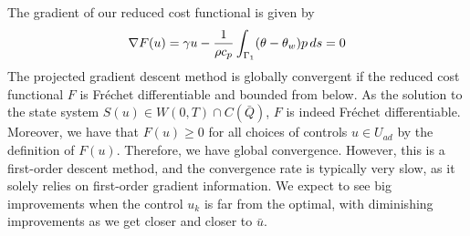 The gradient of our reduced cost functional is given by
%
\begin{equation*}
    \nabla F(u) =  \gamma u - \frac{1}{\rho c_p} \int_{\Gamma_1} (\theta - \theta_w)p \mathop{ds} = 0
\end{equation*}
%
The projected gradient descent method is globally convergent if the reduced cost functional $F$ is Fréchet differentiable and bounded from below. As the solution to the state system $S(u) \in W(0,T) \cap C(\bar{Q})$, $F$ is indeed Fréchet differentiable. Moreover, we have that $F(u) \geq 0$ for all choices of controls $u \in U_{ad}$ by the definition of $F(u)$. Therefore, we have global convergence. However, this is a first-order descent method, and the convergence rate is typically very slow, as it solely relies on first-order gradient information. We expect to see big improvements when the control $u_k$ is far from the optimal, with diminishing improvements as we get closer and closer to $\bar{u}$.

